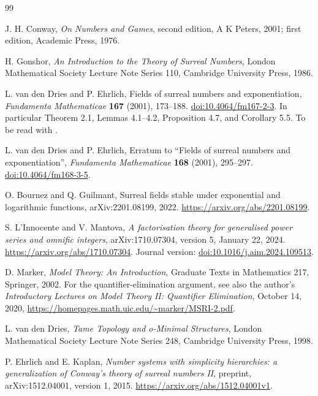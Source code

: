 \documentclass[11pt,a4paper]{article}
\numberwithin{equation}{section}
\theoremstyle{definition}
\theoremstyle{remark}
\begin{document}
\begin{thebibliography}{99}

J. H. Conway, \emph{On Numbers and Games}, second edition,
A K Peters, 2001; first edition, Academic Press, 1976.

H. Gonshor, \emph{An Introduction to the Theory of Surreal Numbers},
London Mathematical Society Lecture Note Series 110,
Cambridge University Press, 1986.

L. van den Dries and P. Ehrlich,
Fields of surreal numbers and exponentiation,
\emph{Fundamenta Mathematicae} \textbf{167} (2001), 173--188.
\href{https://doi.org/10.4064/fm167-2-3}{doi:10.4064/fm167-2-3}.
In particular Theorem 2.1, Lemmas 4.1--4.2, Proposition 4.7, and
Corollary 5.5. To be read with \cite{vdDEerr}.

L. van den Dries and P. Ehrlich, Erratum to ``Fields of surreal numbers and
exponentiation'', \emph{Fundamenta Mathematicae} \textbf{168} (2001),
295--297.
\href{https://doi.org/10.4064/fm168-3-5}{doi:10.4064/fm168-3-5}.

O. Bournez and Q. Guilmant, Surreal fields stable under exponential and
logarithmic functions, arXiv:2201.08199, 2022.
\url{https://arxiv.org/abs/2201.08199}.

S. L'Innocente and V. Mantova,
\emph{A factorisation theory for generalised power series and omnific
integers}, arXiv:1710.07304, version 5, January 22, 2024.
\url{https://arxiv.org/abs/1710.07304}.
Journal version: \href{https://doi.org/10.1016/j.aim.2024.109513}
{doi:10.1016/j.aim.2024.109513}.

D. Marker, \emph{Model Theory: An Introduction}, Graduate Texts in
Mathematics 217, Springer, 2002.
For the quantifier-elimination argument, see also the author's
\emph{Introductory Lectures on Model Theory II: Quantifier Elimination},
October 14, 2020,
\url{https://homepages.math.uic.edu/~marker/MSRI-2.pdf}.

L. van den Dries, \emph{Tame Topology and o-Minimal Structures}, London
Mathematical Society Lecture Note Series 248, Cambridge University Press,
1998.

P. Ehrlich and E. Kaplan, \emph{Number systems with simplicity hierarchies:
a generalization of Conway's theory of surreal numbers II}, preprint,
arXiv:1512.04001, version 1, 2015. \url{https://arxiv.org/abs/1512.04001v1}.


\end{thebibliography}
\end{document}
